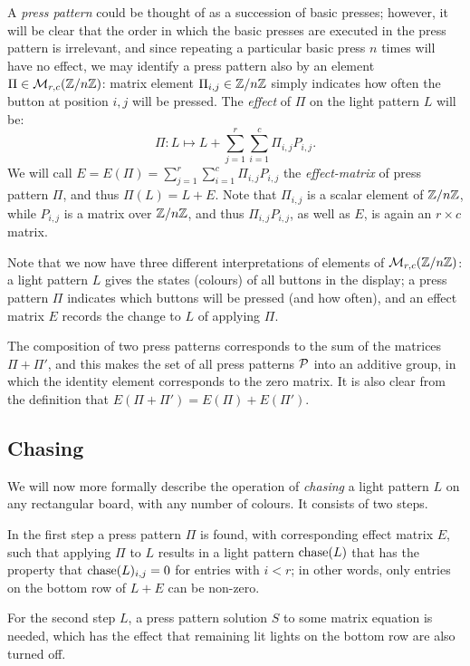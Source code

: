 A {\it press pattern} could be thought of as a succession of 
basic presses; however, it will be clear that the order in which the
basic presses are executed in the press pattern is irrelevant, and since 
repeating a particular basic press $n$ times will have no effect,
we may identify a press pattern also by an element 
$\Pi\in\mathcal{M}_{r,c}(\mathbb{Z}/n\mathbb{Z})$:
matrix element $\Pi_{i,j}\in\mathbb{Z}/n\mathbb{Z}$ simply indicates how often the button
at position $i, j$ will be pressed. The {\it effect} of $\Pi$ on the light
pattern $L$ will be:
$$\Pi:L\mapsto L+\sum_{j=1}^r\sum_{i=1}^c \Pi_{i, j}P_{i, j}.$$
We will call $E=E(\Pi)=\sum_{j=1}^r\sum_{i=1}^c \Pi_{i, j}P_{i, j}$ the
{\it effect-matrix} of press pattern $\Pi$, and thus
$\Pi(L)=L+E$. Note that $\Pi_{i,j}$ is a scalar element of $\mathbb{Z}/n\mathbb{Z}$, while
$P_{i, j}$ is a matrix over $\mathbb{Z}/n\mathbb{Z}$, and thus $\Pi_{i, j}P_{i, j}$,
as well as $E$, is again an $r\times c$ matrix.

Note that we now have three different interpretations of elements
of $\mathcal{M}_{r,c}(\mathbb{Z}/n\mathbb{Z})$: a light pattern $L$ gives the states (colours)
of all buttons in the display; a press pattern $\Pi$ indicates which buttons
will be pressed (and how often), and an effect matrix $E$ records
the change to $L$ of applying $\Pi$.

The composition of two press patterns 
corresponds to the sum of the matrices $\Pi+\Pi'$, and this makes 
the set of all press patterns $\cal P$ into an additive group,
in which the identity element corresponds to the zero matrix.
It is also clear from the definition that $E(\Pi+\Pi')=E(\Pi)+E(\Pi')$.
\subsection*{Chasing}
We will now more formally describe the operation of {\it chasing}
a light pattern $L$ on any rectangular board, with any number
of colours. It consists of two steps.

In the first step a press pattern $\Pi$ is found,
with corresponding effect matrix $E$, such that applying
$\Pi$ to $L$ results in a light pattern $\operatorname{chase}(L)$ that has the property
that $\operatorname{chase}(L)_{i,j}=0$ for entries with $i<r$; in other words, 
only entries on the bottom row of $L+E$ can be non-zero.

For the second step $L$, a press pattern solution $S$ to some matrix
equation is needed, which has the effect that remaining lit lights
on the bottom row are also turned off.

